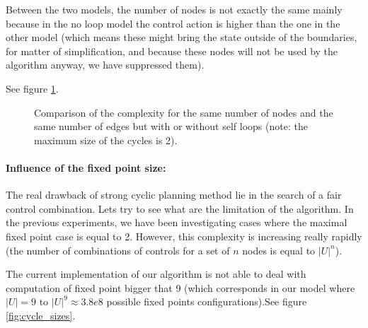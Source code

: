 Between the two models, the number of nodes is not exactly the same mainly because in the no loop model the control action is higher than the one in the other model (which means these might bring the state outside of the boundaries, for matter of simplification, and because these nodes will not be used by the algorithm anyway, we have suppressed them).

See figure \ref{fig:same_nbre_nodes}.

\datasamenode

\begin{figure}
\center
{}
\caption{Comparison of the complexity for the same number of nodes and the same number of edges but with or without self loops (note: the maximum size of the cycles is 2).}
\label{fig:same_nbre_nodes}
\end{figure}

\paragraph{Influence of the fixed point size:}
The real drawback of strong cyclic planning method lie in the search of a fair control combination. Lets try to see what are the limitation of the algorithm.
In the previous experiments, we have been investigating cases where the maximal fixed point case is equal to 2. However, this complexity is increasing really rapidly (the number of combinations of controls for a set of $n$ nodes is equal to $|U|^n$).

The current implementation of our algorithm is not able to deal with computation of fixed point bigger that 9 (which corresponds in our model where $|U|= 9$ to $|U|^9 \approx 3.8e8$ possible fixed points configurations).See figure \ref{fig:cycle_sizes}.

